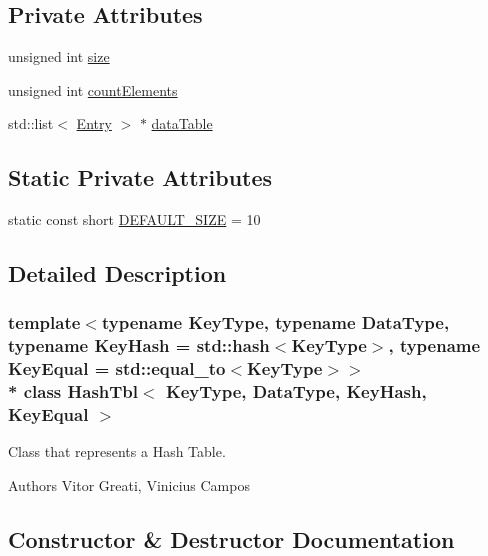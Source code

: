 \subsection*{Private Attributes}
\begin{DoxyCompactItemize}
\item 
unsigned int \hyperlink{classHashTbl_a6335ac2d69675a22061cb6fde504f21c}{size}
\item 
unsigned int \hyperlink{classHashTbl_a23cbbbac6cc41d1d85c2261a854e67e7}{count\+Elements}
\item 
std\+::list$<$ \hyperlink{classHashEntry}{Entry} $>$ $\ast$ \hyperlink{classHashTbl_a692d3f189bb65ea4a1fff9ddc32674e4}{data\+Table}
\end{DoxyCompactItemize}
\subsection*{Static Private Attributes}
\begin{DoxyCompactItemize}
\item 
static const short \hyperlink{classHashTbl_aeffa5b1a163fb6a09a18fd254a4d6dcf}{D\+E\+F\+A\+U\+L\+T\+\_\+\+S\+I\+ZE} = 10
\end{DoxyCompactItemize}


\subsection{Detailed Description}
\subsubsection*{template$<$typename Key\+Type, typename Data\+Type, typename Key\+Hash = std\+::hash$<$\+Key\+Type$>$, typename Key\+Equal = std\+::equal\+\_\+to$<$\+Key\+Type$>$$>$\\*
class Hash\+Tbl$<$ Key\+Type, Data\+Type, Key\+Hash, Key\+Equal $>$}

Class that represents a Hash Table. 

\begin{DoxyAuthor}{Authors}
Vitor Greati, Vinicius Campos 
\end{DoxyAuthor}


\subsection{Constructor \& Destructor Documentation}
